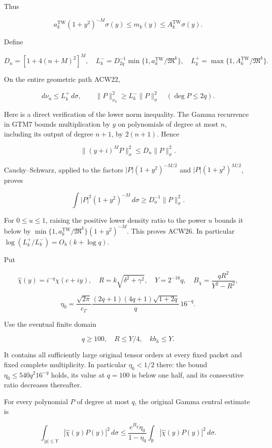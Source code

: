 \documentclass[11pt,a4paper]{article}
\begin{document}
Thus

\[
a_k^{\mathrm{TW}}(1+y^2)^{-M}\sigma(y)
\le m_k(y)\le A_k^{\mathrm{TW}}\sigma(y).
\]

Define

\[
D_n=[1+4(n+M)^2]^M,
\quad
L_k^- = D_{2q}^{-1}\min\{1,a_k^{\mathrm{TW}}/\mathfrak M^k\},
\quad
L_k^+ = \max\{1,A_k^{\mathrm{TW}}/\mathfrak M^k\}.
\tag{ACW25}
\]

On the entire geometric path ACW22,

\[
d\nu_u\le L_k^+\,d\sigma,
\qquad
\|P\|_{\nu_u}^2\ge L_k^-\|P\|_\sigma^2
\quad(\deg P\le2q).
\tag{ACW26}
\]

Here is a direct verification of the lower norm inequality. The Gamma recurrence in GTM7 bounds multiplication by \(y\) on polynomials of degree at most \(n\), including its output of degree \(n+1\), by \(2(n+1)\). Hence

\[
\|(y+i)^M P\|_\sigma^2\le D_n\|P\|_\sigma^2.
\]

Cauchy--Schwarz, applied to the factors \(|P|(1+y^2)^{-M/2}\) and \(|P|(1+y^2)^{M/2}\), proves

\[
\int|P|^2(1+y^2)^{-M}\,d\sigma\ge D_n^{-1}\|P\|_\sigma^2.
\]

For \(0\le u\le1\), raising the positive lower density ratio to the power \(u\) bounds it below by
\(\min\{1,a_k^{\mathrm{TW}}/\mathfrak M^k\}(1+y^2)^{-M}\).
This proves ACW26. In particular
\(\log(L_k^+/L_k^-)=O_h(k+\log q)\).

Put

\[
\widehat\chi(y)=i^{-q}\chi(c+iy),\quad
R=k\sqrt{\delta^2+\gamma^2},\quad
Y=2^{-16}q,\quad
B_\chi=\frac{qR^2}{Y^2-R^2},
\]

\[
\eta_0=
\frac{\sqrt{2\pi}}{c_\Gamma}
\frac{(2q+1)(4q+1)\sqrt{1+2q}}q\,16^{-q}.
\tag{ACW27}
\]

Use the eventual finite domain

\[
q\ge100,\quad R\le Y/4,\quad kb_h\le Y.
\]

It contains all sufficiently large original tensor orders at every fixed packet and fixed complete multiplicity. In particular \(\eta_0<1/2\) there: the bound \(\eta_0\le540q^2 16^{-q}\) holds, its value at \(q=100\) is below one half, and its consecutive ratio decreases thereafter.

For every polynomial \(P\) of degree at most \(q\), the original Gamma central estimate is

\[
\int_{|y|\le Y}|\widehat\chi(y)P(y)|^2\,d\sigma
\le
\frac{e^{B_\chi}\eta_0}{1-\eta_0}
\int_{\mathbb R}|\widehat\chi(y)P(y)|^2\,d\sigma.
\tag{ACW28}
\]
\end{document}
